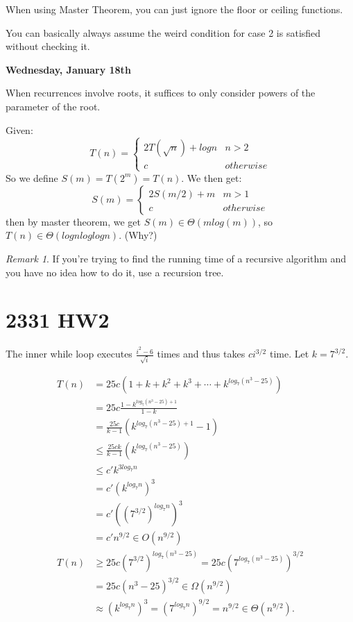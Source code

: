\documentclass[reqno]{amsbook}
\theoremstyle{plain}
\numberwithin{section}{chapter}
\numberwithin{equation}{chapter}
\theoremstyle{definition}
\theoremstyle{remark}
\newtheorem{rem}[theorem]{Remark}
\begin{document}
When using Master Theorem, you can just ignore the floor or ceiling functions. 

You can basically always assume the weird condition for case 2 is satisfied without checking it. 

\textbf{Wednesday, January 18th}

When recurrences involve roots, it suffices to only consider powers of the parameter of the root. 

Given:
$$
T(n) = \begin{cases}
2T(\sqrt{n}) + logn & n > 2\\
c & otherwise
\end{cases}
$$
So we define $S(m) = T(2^m) = T(n)$. We then get: 
$$
S(m) = \begin{cases}
2S(m/2) + m  & m > 1\\
c & otherwise
\end{cases}
$$
then by master theorem, we get $S(m) \in \Theta(mlog(m))$, so $T(n) \in \Theta(logn loglogn)$. (Why?)

\begin{rem}
If you're trying to find the running time of a recursive algorithm and you have no idea how to do it, use a recursion tree. 
\end{rem}
\section{2331 HW2}
The inner while loop executes $\frac{i^2 - 6}{\sqrt{i}}$ times and thus takes $ci^{3/2}$ time. Let $k = 7^{3/2}$. 

\begin{equation}
\begin{aligned}
T(n) &= 25c(1 + k + k^2 + k^3 + \cdots + k^{log_7(n^3 - 25)})\\
&= 25c \frac{1 - k^{log_7(n^3 - 25) + 1}}{1 - k}\\
&= \frac{25c}{k  -1} \left(k^{log_7(n^3 - 25) + 1} - 1 \right)\\
& \leq  \frac{25ck}{k  -1}\left(k^{log_7(n^3 - 25)}\right)\\
& \leq c'k^{3log_7n}\\
& = c'(k^{log_7n})^3\\
& =c'((7^{3/2})^{log_7n})^3\\
&= c'n^{9/2} \in O(n^{9/2})\\
T(n) &\geq 25c(7^{3/2})^{log_7(n^3 - 25)} = 25c(7^{log_7(n^3 - 25)})^{3/2} \\
&= 25c(n^3 - 25)^{3/2} \in \Omega (n^{9/2})\\
&\approx (k^{log_7n})^3  = (7^{log_7n})^{9/2} = n^{9/2} \in \Theta(n^{9/2}).\\
\end{aligned}
\end{equation}
\end{document}
